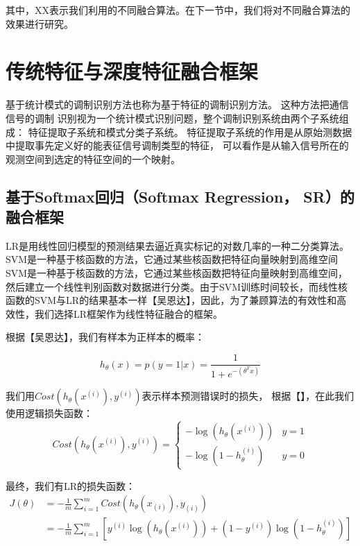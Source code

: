 其中，XX表示我们利用的不同融合算法。在下一节中，我们将对不同融合算法的效果进行研究。


\section{传统特征与深度特征融合框架}

基于统计模式的调制识别方法也称为基于特征的调制识别方法。
这种方法把通信信号的调制
识别视为一个统计模式识别问题，整个调制识别系统由两个子系统组成：
特征提取子系统和模式分类子系统。
特征提取子系统的作用是从原始测数据中提取事先定义好的能表征信号调制类型的特征，
可以看作是从输入信号所在的观测空间到选定的特征空间的一个映射。\par

\subsection{基于Softmax回归（Softmax Regression， SR）的融合框架}
LR是用线性回归模型的预测结果去逼近真实标记的对数几率的一种二分类算法。SVM是一种基于核函数的方法，它通过某些核函数把特征向量映射到高维空间SVM是一种基于核函数的方法，它通过某些核函数把特征向量映射到高维空间，然后建立一个线性判别函数对数据进行分类。由于SVM训练时间较长，而线性核函数的SVM与LR的结果基本一样【吴恩达】，因此，为了兼顾算法的有效性和高效性，我们选择LR框架作为线性特征融合的框架。\par

根据【吴恩达】，我们有样本为正样本的概率：

\begin{equation}
	h_{\theta}(x) = p(y=1|x) = \frac{1}{1 + e^{-(\theta^T x)}}
\end{equation}

我们用$Cost(h_{\theta}(x^{(i)}), y^{(i)}) $表示样本预测错误时的损失，
根据【】，在此我们使用逻辑损失函数：
\begin{equation}
		Cost(h_{\theta}(x^{(i)}), y^{(i)}) = 
			\begin{cases}
				-\log(h_{\theta}(x^{(i)})) & \text{$y = 1$}\\
				-\log(1 - h_{\theta}^{(i)}) & \text{$y = 0$}
			\end{cases}
\end{equation}

最终，我们有LR的损失函数：
\begin{equation}
	\begin{aligned}
		J(\theta) &=- \frac{1}{m} \sum_{i=1}^{m} Cost(h_{\theta}(x_{(i)}), y_{(i)})\\
			&= -\frac{1}{m} \sum_{i=1}^{m} \left[
				y^{(i)} \log(h_{\theta}(x^{(i)})) +
				(1 - y^{(i)})\log(1 - h_{\theta}^{(i)})
			\right]
	\end{aligned}
\end{equation}

